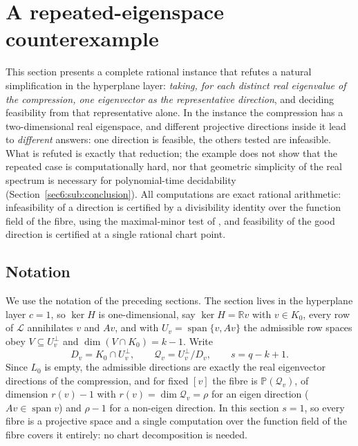 \section{A repeated-eigenspace counterexample}\label{sec:counterexample}

This section presents a complete rational instance that refutes a natural simplification in the
hyperplane layer: \emph{taking, for each distinct real eigenvalue of the compression, one eigenvector as
the representative direction}, and deciding feasibility from that representative alone. In the instance
the compression has a two-dimensional real eigenspace, and different projective directions inside it
lead to \emph{different} answers: one direction is feasible, the others tested are infeasible. What is
refuted is exactly that reduction; the example does not show that the repeated case is computationally
hard, nor that geometric simplicity of the real spectrum is necessary for polynomial-time decidability
(Section~\ref{sec6:sub:conclusion}). All computations are exact rational arithmetic: infeasibility of a
direction is certified by a divisibility identity over the function field of the fibre, using the
maximal-minor test of \cite{companion1}, and feasibility of the good direction is certified at a single
rational chart point.

\subsection{Notation}\label{sec6:sub:notation}

We use the notation of the preceding sections. The section lives in the hyperplane layer $c=1$, so
$\ker H$ is one-dimensional, say $\ker H=\mathbb{R}v$ with $v\in K_0$, every row of $\mathcal{L}$
annihilates $v$ and $Av$, and with $U_v=\operatorname{span}\{v,Av\}$ the admissible row spaces obey
$V\subseteq U_v^{\perp}$ and $\dim(V\cap K_0)=k-1$. Write
\begin{equation}\label{sec6:eq:defs}
D_v=K_0\cap U_v^{\perp},\qquad \mathcal{Q}_v=U_v^{\perp}/D_v,\qquad s=q-k+1 .
\end{equation}
Since $L_0$ is empty, the admissible directions are exactly the real eigenvector directions of the
compression, and for fixed $[v]$ the fibre is $\mathbb{P}(\mathcal{Q}_v)$, of dimension $r(v)-1$ with
$r(v)=\dim\mathcal{Q}_v=\rho$ for an eigen direction ($Av\in\operatorname{span}v$) and $\rho-1$ for a
non-eigen direction. In this section $s=1$, so every fibre is a projective space and a single
computation over the function field of the fibre covers it entirely: no chart decomposition is needed.

